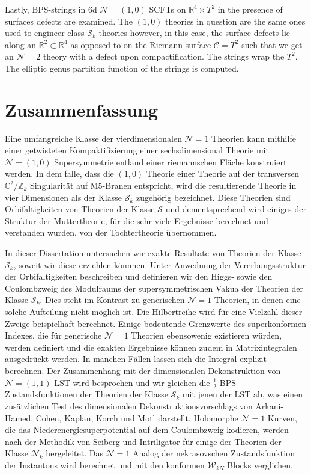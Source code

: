 {Lastly, BPS-strings in 6d $\mathcal{N}=(1,0)$ SCFTs on $\mathbb{R}^4\times T^2$ in the presence of surfaces defects are examined. The $(1,0)$ theories in question are the same ones used to engineer class $\mathcal{S}_k$ theories however, in this case, the surface defects lie along an $\mathbb{R}^2\subset\mathbb{R}^4$ as opposed to on the Riemann surface $\mathcal{C}=T^2$ such that we get an $\mathcal{N}=2$ theory with a defect upon compactification. The strings wrap the $T^2$. The elliptic genus partition function of the strings is computed.
}

\pagestyle{empty}
\cleardoublepage
{}
\section*{Zusammenfassung}
\onehalfspacing 
{\normalsize Eine umfangreiche Klasse der vierdimensionalen $\mathcal{N}=1$ Theorien kann mithilfe einer getwisteten Kompaktifizierung einer sechsdimensional Theorie mit $\mathcal{N}=(1,0)$ Supersymmetrie entland einer riemannschen Fl\"ache konstruiert werden. In dem falle, dass die $(1,0)$ Theorie einer Theorie auf der transversen $\mathbb{C}^2/\mathbb{Z}_k$ Singularit\"at auf M$5$-Branen entspricht, wird die resultierende Theorie in vier Dimensionen als der Klasse $\mathcal{S}_k$ zugeh\"orig bezeichnet. Diese Theorien sind Orbifaltigkeiten von Theorien der Klasse $\mathcal{S}$ und dementsprechend wird einiges der Struktur der Muttertheorie, f\"ur die sehr viele Ergebnisse berechnet und verstanden wurden, von der Tochtertheorie \"ubernommen.

In dieser Dissertation untersuchen wir exakte Resultate von Theorien der Klasse $\mathcal{S}_k$, soweit wir diese erziehlen k\"onnnen. Unter Anwednung der Vererbungsstruktur der Orbifaltigkeiten beschreiben und definieren wir den Higgs- sowie den Coulombzweig des Modulraums der supersymmetrischen Vakua der Theorien der Klasse $\mathcal{S}_k$. Dies steht im Kontrast zu generischen $\mathcal{N}=1$ Theorien, in denen eine solche Aufteilung nicht m\"oglich ist. Die Hilbertreihe wird f\"ur eine Vielzahl dieser Zweige beispielhaft berechnet. Einige bedeutende Grenzwerte des superkonformen Indexes, die f\"ur generische $\mathcal{N}=1$ Theorien ebensowenig existieren w\"urden, werden definiert und die exakten Ergebnisse k\"onnen zudem in Matrixintegralen ausgedr\"uckt werden. In manchen F\"allen lassen sich die Integral explizit berechnen. Der Zusammenhang mit der dimensionalen Dekonstruktion von $\mathcal{N}=(1,1)$ LST wird besprochen und wir gleichen die $\frac{1}{2}$-BPS Zustandsfunktionen der Theorien der Klasse $\mathcal{S}_k$ mit jenen der LST ab, was einen zus\"atzlichen Test des dimensionalen Dekonstruktionsvorschlags von Arkani-Hamed, Cohen, Kaplan, Korch und Motl darstellt. Holomorphe $\mathcal{N}=1$ Kurven, die das Niederenergiesuperpotential auf dem Coulombzweig kodieren, werden nach der Methodik von Seiberg und Intriligator f\"ur einige der Theorien der Klasse $\mathcal{N}_k$ hergeleitet. Das $\mathcal{N}=1$ Analog der nekrasovschen Zustandsfunktion der Instantons wird berechnet und mit den konformen $\mathcal{W}_{kN}$ Blocks verglichen.

}

